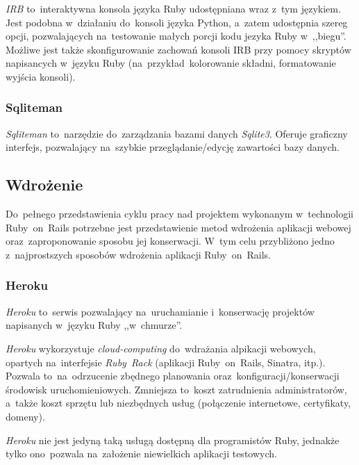 \textit{IRB} to~interaktywna konsola języka Ruby udostępniana wraz z~tym językiem. Jest podobna w~działaniu do~konsoli języka Python, a~zatem udostępnia szereg opcji, pozwalających na~testowanie małych porcji kodu jezyka Ruby w~,,biegu''. Możliwe jest także skonfigurowanie zachowań konsoli IRB przy pomocy skryptów napisancych w~języku Ruby (na~przykład~kolorowanie składni, formatowanie wyjścia konsoli).

\subsubsection{Sqliteman}

\textit{Sqliteman} \cite{sqliteman} to~narzędzie do~zarządzania bazami danych \textit{Sqlite3}. Oferuje graficzny interfejs, pozwalający na~szybkie przeglądanie/edycję zawartości bazy danych.

\subsection{Wdrożenie}

Do~pełnego przedstawienia cyklu pracy nad projektem wykonanym w~technologii Ruby~on~Rails potrzebne jest przedstawienie metod wdrożenia aplikacji webowej oraz~zaproponowanie sposobu jej konserwacji. W~tym celu przybliżono jedno z~najprostszych sposobów wdrożenia aplikacji Ruby~on~Rails.

\subsubsection{Heroku}

\textit{Heroku} \cite{heroku} to~serwis pozwalający na~uruchamianie i~konserwację projektów napisanych w~języku Ruby ,,w~chmurze''.


\textit{Heroku} wykorzystuje \textit{cloud-computing} do~wdrażania alpikacji webowych, opartych na~interfejsie \textit{Ruby~Rack} (aplikacji Ruby~on~Rails, Sinatra, itp.). Pozwala to~na~odrzucenie zbędnego planowania oraz~konfiguracji/konserwacji środowisk uruchomieniowych. Zmniejsza to~koszt zatrudnienia administratorów, a~także koszt sprzętu lub niezbędnych usług (połączenie internetowe, certyfikaty, domeny).


\textit{Heroku} nie jest jedyną taką usługą dostępną dla programistów Ruby, jednakże tylko ono~pozwala na~założenie niewielkich aplikacji testowych.
